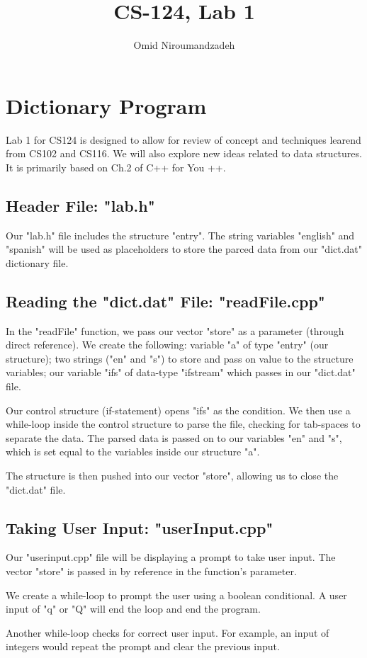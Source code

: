 \documentclass{article}
\begin{document}
\title{CS-124, Lab 1}
\author{Omid Niroumandzadeh}
\section{Dictionary Program}
Lab 1 for CS124 is designed to allow for review of concept and
techniques learend from CS102 and CS116. We will also explore new
ideas related to data structures. It is primarily based on Ch.2 of
C++ for You ++.
\subsection{Header File: "lab.h"}
Our "lab.h" file includes the structure "entry". The 
string variables "english" and "spanish" will be used
as placeholders to store the parced data from our
"dict.dat" dictionary file.
\clearpage
\subsection{Reading the "dict.dat" File: "readFile.cpp"}
In the "readFile" function, we pass our vector "store" as a 
parameter (through direct reference). We create the following: 
variable "a" of type "entry" (our structure); two strings ("en" and "s")
to store and pass on value to the structure variables; our 
variable "ifs" of data-type "ifstream" which passes in our
"dict.dat" file.

Our control structure (if-statement) opens "ifs" as the condition. 
We then use a while-loop inside the control structure to parse
the file, checking for tab-spaces to separate the data. The parsed
data is passed on to our variables "en" and "s", which is set equal
to the variables inside our structure "a".

The structure is then pushed into our vector "store", allowing us
to close the "dict.dat" file.
\clearpage
\subsection{Taking User Input: "userInput.cpp"}
Our "userinput.cpp" file will be displaying a prompt to take user input.
The vector "store" is passed in by reference in the function's
parameter.

We create a while-loop to prompt the user using a boolean
conditional. A user input of "q" or "Q" will end the loop
and end the program.

Another while-loop checks for correct user input. For example,
an input of integers would repeat the prompt and clear the
previous input.
\end{document}
